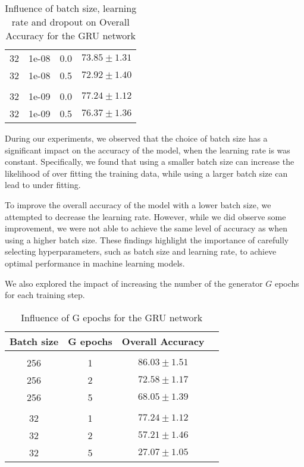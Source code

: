 \begin{table}[H]
\begin{tabular}{cccr}
      32  &   1e-08 & 0.0 & $73.85 \pm 1.31$\\
      32  &   1e-08 & 0.5 & $72.92 \pm 1.40$\\[0.05cm] \hline \\[-0.25cm]

      32  &   1e-09 & 0.0 & $\mathbf{77.24 \pm 1.12}$\\
      32  &   1e-09 & 0.5 & $76.37 \pm 1.36$\\
  \end{tabular}
  \caption{Influence of batch size, learning rate and dropout on Overall Accuracy for the GRU network}
  \label{tab:AJRNNbatchsize}
\end{table}

During our experiments, we observed that the choice of batch size has a significant impact on the accuracy of the model, when the learning rate is was constant.
Specifically, we found that using a smaller batch size can increase the likelihood of over fitting the training data, while using a larger batch size can lead to under fitting.

To improve the overall accuracy of the model with a lower batch size, we attempted to decrease the learning rate.
However, while we did observe some improvement, we were not able to achieve the same level of accuracy as when using a higher batch size.
These findings highlight the importance of carefully selecting hyperparameters, such as batch size and learning rate, to achieve optimal performance in machine learning models.

We also explored the impact of increasing the number of the generator $G$ epochs for each training step.

\begin{table}[H]
  \centering
  \begin{tabular}{cccr} 
      Batch size & G epochs & Overall Accuracy\\[0.2cm] 
      \hline \\[-0.2cm]
      256 &   1 &  $\mathbf{86.03 \pm 1.51}$\\
      256 &   2 &  $72.58 \pm 1.17$\\
      256 &   5 &  $68.05 \pm 1.39$\\[0.05cm] \hline \\[-0.25cm]
      32  &   1 &  $\mathbf{77.24 \pm 1.12}$\\
      32  &   2 &  $57.21 \pm 1.46$\\
      32  &   5 &  $27.07 \pm 1.05$\\
  \end{tabular}
  \caption{Influence of G epochs for the GRU network}
  \label{tab:AJRNNGepochs}
\end{table}

